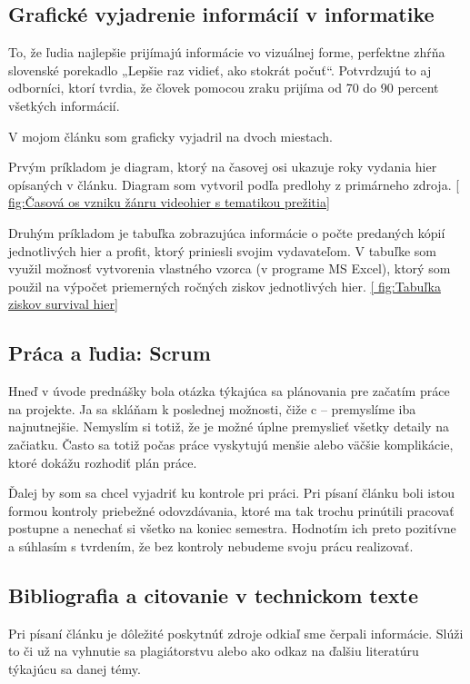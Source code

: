 \documentclass[10pt,oneoside,slovak,a4paper]{article}
\begin{document}
\subsection{Grafické vyjadrenie informácií v informatike}

To, že ľudia najlepšie prijímajú informácie vo vizuálnej forme, perfektne zhŕňa slovenské porekadlo „Lepšie raz vidieť, ako stokrát počuť“. Potvrdzujú to aj odborníci, ktorí tvrdia, že človek pomocou zraku prijíma od 70 do 90 percent všetkých informácií. \cite{Regec}

V mojom článku som graficky vyjadril na dvoch miestach. 

Prvým príkladom je diagram, ktorý na časovej osi ukazuje roky vydania hier opísaných v článku. Diagram som vytvoril podľa predlohy z primárneho zdroja. \ref{ fig:Časová os vzniku žánru videohier s tematikou prežitia}

Druhým príkladom je tabuľka zobrazujúca informácie o počte predaných kópií jednotlivých hier a profit, ktorý priniesli svojim vydavateľom. V tabuľke som využil možnosť vytvorenia vlastného vzorca (v programe MS Excel), ktorý som použil na výpočet priemerných ročných ziskov jednotlivých hier. \ref{ fig:Tabuľka ziskov survival hier}

\newpage

\subsection{Práca a ľudia: Scrum}

Hneď v úvode prednášky bola otázka týkajúca sa plánovania pre začatím práce na projekte. Ja sa skláňam k poslednej možnosti, čiže c – premyslíme iba najnutnejšie. Nemyslím si totiž, že je možné úplne premyslieť všetky detaily na začiatku. Často sa  totiž počas práce vyskytujú menšie alebo väčšie komplikácie, ktoré dokážu rozhodiť plán práce.

Ďalej by som sa chcel vyjadriť ku kontrole pri práci.  Pri písaní článku boli istou formou kontroly priebežné odovzdávania, ktoré ma tak trochu prinútili pracovať postupne a nenechať si všetko na koniec semestra. Hodnotím ich preto pozitívne a súhlasím s tvrdením, že bez kontroly nebudeme svoju prácu realizovať. 


\subsection{Bibliografia a citovanie v technickom texte}
Pri písaní článku je dôležité poskytnúť zdroje odkiaľ sme čerpali informácie. Slúži to či už na vyhnutie sa plagiátorstvu alebo ako odkaz na ďalšiu literatúru týkajúcu sa danej témy.
\end{document}
